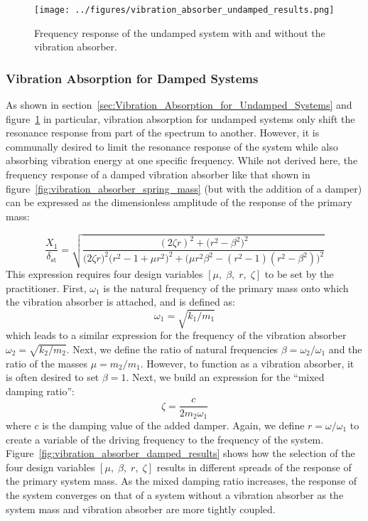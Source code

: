 \documentclass[12pt,letter]{article}
\begin{document}
\begin{figure}[H]
    \centering
    \texttt{[image: ../figures/vibration\_absorber\_undamped\_results.png]}
    \caption{Frequency response of the undamped system with and without the vibration absorber.}
    \label{fig:vibration_absorber_undamped_results}
\end{figure}



\subsubsection{Vibration Absorption for Damped Systems}

As shown in section~\ref{sec:Vibration_Absorption_for_Undamped_Systems} and figure~\ref{fig:vibration_absorber_undamped_results} in particular, vibration absorption for undamped systems only shift the resonance response from part of the spectrum to another. However, it is communally desired to limit the resonance response of the system while also absorbing vibration energy at one specific frequency. While not derived here, the frequency response of a damped vibration absorber like that shown in figure~\ref{fig:vibration_absorber_spring_mass} (but with the addition of a damper) can be expressed as the dimensionless amplitude of the response of the primary mass: 

\begin{equation}
\frac{X_1}{\delta_{\text{st}}} = \sqrt{\frac{(2 \zeta r)^2 + \big(r^2 - \beta^2 \big)^2 }{\big(2 \zeta r \big)^2 \big(r^2 -1 +\mu r^2 \big)^2 + \big(\mu r^2 \beta^2 - (r^2 -1)(r^2 -\beta^2)\big)^2} }
\label{eq:X1_norm_displacement_damped}
\end{equation}
This expression requires four design variables $[\mu, \; \beta, \; r, \; \zeta]$ to be set by the practitioner. First, $\omega_1$ is the natural frequency of the primary mass onto which the vibration absorber is attached, and is defined as:
\begin{equation}
\omega_1 = \sqrt{k_1/m_1}
\end{equation}
which leads to a similar expression for the frequency of the vibration absorber $\omega_2 = \sqrt{k_2/m_2}$. Next, we define the ratio of natural frequencies $\beta = \omega_2/ \omega_1$ and the ratio of the masses $\mu = m_2/m_1$. However, to function as a vibration absorber, it is often desired to set $\beta = 1$. Next, we build an expression for the ``mixed damping ratio'':
\begin{equation}
\zeta = \frac{c}{2 m_2 \omega_1}
\end{equation}
where $c$ is the damping value of the added damper. Again, we define $r=\omega / \omega_1$ to create a variable of the driving frequency to the frequency of the system. Figure~\ref{fig:vibration_absorber_damped_results} shows how the selection of the four design variables $[\mu, \; \beta, \; r, \; \zeta]$ results in different spreads of the response of the primary system mass. As the mixed damping ratio increases, the response of the system converges on that of a system without a vibration absorber as the system mass and vibration absorber are more tightly coupled. 
\end{document}

